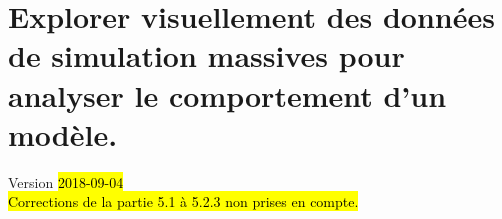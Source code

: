 \chapter{Explorer visuellement des données de simulation massives pour analyser le comportement d'un modèle.}
\begin{center}
	{\large Version \hl{2018-09-04}}\\
	\hl{Corrections de la partie 5.1 à 5.2.3 non prises en compte.}

\end{center}
\minitoc

\clearpage

%
%
%
%
%
%
